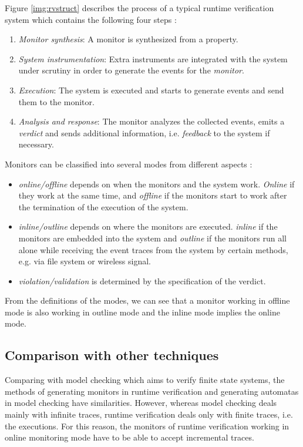 Figure \ref{img:rvstruct} describes the process of a typical runtime verification system which contains the following four steps \citep{falcone2013tutorial}:
\begin{enumerate}
\item \emph{Monitor synthesis}: A monitor is synthesized from a property.
\item \emph{System instrumentation}: Extra instruments are integrated with the system under scrutiny in order to generate the events for the \emph{monitor}.
\item \emph{Execution}: The system is executed and starts to generate events and send them to the monitor.
\item \emph{Analysis and response}: The monitor analyzes the collected events, emits a \emph{verdict} and sends additional information, i.e. \emph{feedback} to the system if necessary.
\end{enumerate}

Monitors can be classified into several modes from different aspects \citep{chen2007mop}:
\begin{itemize}
\item \emph{online/offline} depends on when the monitors and the system work. \emph{Online} if they work at the same time, and \emph{offline} if the monitors start to work after the termination of the execution of the system.
\item \emph{inline/outline} depends on where the monitors are executed. \emph{inline} if the monitors are embedded into the system and \emph{outline} if the monitors run all alone while receiving the event traces from the system by certain methods, e.g. via file system or wireless signal.
\item \emph{violation/validation} is determined by the specification of the verdict.
\end{itemize}

From the definitions of the modes, we can see that a monitor working in offline mode is also working in outline mode and the inline mode implies the online mode.

\subsection{Comparison with other techniques}

Comparing with model checking \citep{clarke1999model} which aims to verify finite state systems, the methods of generating monitors in runtime verification and generating automatas in model checking have similarities. However, whereas model checking deals mainly with infinite traces, runtime verification deals only with finite traces, i.e. the executions. For this reason, the monitors of runtime verification working in online monitoring mode have to be able to accept incremental traces.

